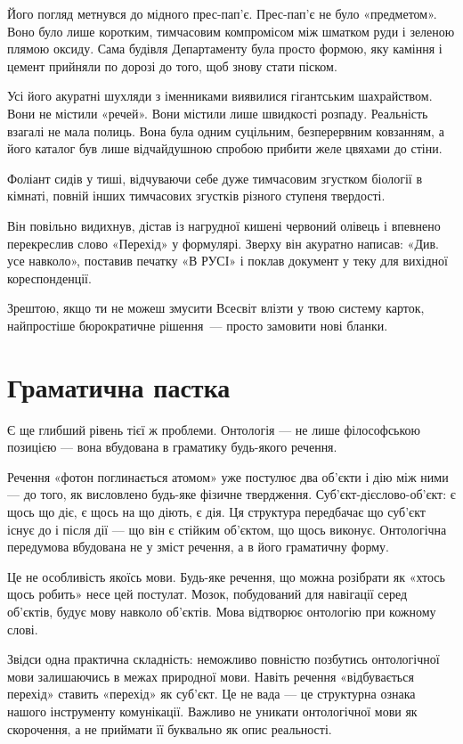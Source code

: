 \documentclass[12pt, a4paper, openany]{book}
\begin{document}
\begin{terrybox}
Його погляд метнувся до мідного прес-пап'є. Прес-пап'є не було «предметом». Воно було лише коротким, тимчасовим компромісом між шматком руди і зеленою плямою оксиду. Сама будівля Департаменту була просто формою, яку каміння і цемент прийняли по дорозі до того, щоб знову стати піском.

Усі його акуратні шухляди з іменниками виявилися гігантським шахрайством. Вони не містили «речей». Вони містили лише швидкості розпаду. Реальність взагалі не мала полиць. Вона була одним суцільним, безперервним ковзанням, а його каталог був лише відчайдушною спробою прибити желе цвяхами до стіни.

Фоліант сидів у тиші, відчуваючи себе дуже тимчасовим згустком біології в кімнаті, повній інших тимчасових згустків різного ступеня твердості.

Він повільно видихнув, дістав із нагрудної кишені червоний олівець і впевнено перекреслив слово «Перехід» у формулярі. Зверху він акуратно написав: «Див. усе навколо», поставив печатку «В РУСІ» і поклав документ у теку для вихідної кореспонденції.

Зрештою, якщо ти не можеш змусити Всесвіт влізти у твою систему карток, найпростіше бюрократичне рішення~--- просто замовити нові бланки.
\end{terrybox}

\section{Граматична пастка}

Є ще глибший рівень тієї ж проблеми. Онтологія — не лише філософською позицією — вона вбудована в граматику будь-якого речення.

Речення «фотон поглинається атомом» уже постулює два об'єкти і дію між ними — до того, як висловлено будь-яке фізичне твердження. Суб'єкт-дієслово-об'єкт: є щось що діє, є щось на що діють, є дія. Ця структура передбачає що суб'єкт існує до і після дії — що він є стійким об'єктом, що щось виконує. Онтологічна передумова вбудована не у зміст речення, а в його граматичну форму.

Це не особливість якоїсь мови. Будь-яке речення, що можна розібрати як «хтось щось робить» несе цей постулат. Мозок, побудований для навігації серед об'єктів, будує мову навколо об'єктів. Мова відтворює онтологію при кожному слові.

Звідси одна практична складність: неможливо повністю позбутись онтологічної мови залишаючись в межах природної мови. Навіть речення «відбувається перехід» ставить «перехід» як суб'єкт. Це не вада — це структурна ознака нашого інструменту комунікації. Важливо не уникати онтологічної мови як скорочення, а не приймати її буквально як опис реальності.
\end{document}
